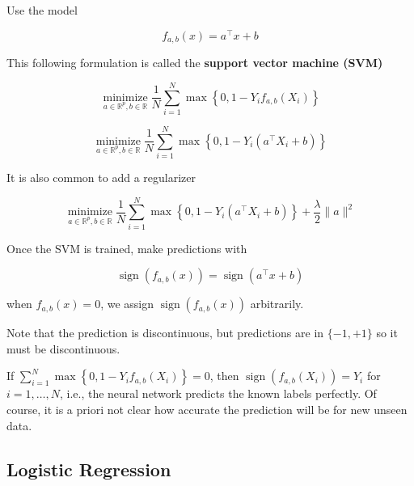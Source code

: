 \begin{definition}
    Use the model

    $$
    f_{a, b}(x)=a^{\top} x+b
    $$

    This following formulation is called the \textbf{support vector machine (SVM)}

    $$
    \underset{a \in \mathbb{R}^{p}, b \in \mathbb{R}}{\operatorname{minimize}} \frac{1}{N} \sum_{i=1}^{N} \max \left\{0,1-Y_{i} f_{a, b}\left(X_{i}\right)\right\}
    $$

    $$
    \underset{a \in \mathbb{R}^{p}, b \in \mathbb{R}}{\operatorname{minimize}} \frac{1}{N} \sum_{i=1}^{N} \max \left\{0,1-Y_{i}\left(a^{\top} X_{i}+b\right)\right\}
    $$

    It is also common to add a regularizer

    $$
    \underset{a \in \mathbb{R}^{p}, b \in \mathbb{R}}{\operatorname{minimize}} \frac{1}{N} \sum_{i=1}^{N} \max \left\{0,1-Y_{i}\left(a^{\top} X_{i}+b\right)\right\}+\frac{\lambda}{2}\|a\|^{2}
    $$
\end{definition}

\begin{concept}
    Once the SVM is trained, make predictions with

    $$
    \operatorname{sign}\left(f_{a, b}(x)\right)=\operatorname{sign}\left(a^{\top} x+b\right)
    $$

    when $f_{a, b}(x)=0$, we assign $\operatorname{sign}\left(f_{a, b}(x)\right)$ arbitrarily.

    Note that the prediction is discontinuous, but predictions are in $\{-1,+1\}$ so it must be discontinuous.

    If $\sum_{i=1}^{N} \max \left\{0,1-Y_{i} f_{a, b}\left(X_{i}\right)\right\}=0$, then $\operatorname{sign}\left(f_{a, b}\left(X_{i}\right)\right)=Y_{i}$ for $i=1, \ldots, N$, i.e., the neural network predicts the known labels perfectly.
    Of course, it is a priori not clear how accurate the prediction will be for new unseen data.
\end{concept}

\subsection{Logistic Regression}

